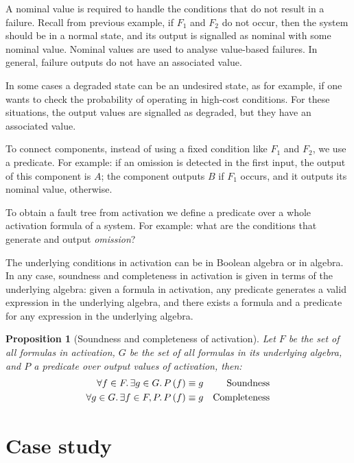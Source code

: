\documentclass[12pt,openright,twoside,a4paper,oldfontcommands,english,brazil,final]{abntex2}
\theoremstyle{theo}
\newtheorem{proposition}{Proposition}[chapter]
\newcommand{\parsin}[1]{\ensuremath\left( #1 \right)}
\begin{document}
A nominal value is required to handle the conditions that do not result in a failure.
Recall from previous example, if $F_1$ and $F_2$ do not occur, then the system should be in a normal state, and its output is signalled as nominal with some nominal value.
Nominal values are used to analyse value-based failures.
In general, failure outputs do not have an associated value.

In some cases a degraded state can be an undesired state, as for example, if one wants to check the probability of operating in high-cost conditions.
For these situations, the output values are signalled as degraded, but they have an associated value.

To connect components, instead of using a fixed condition like $F_1$ and $F_2$, we use a predicate.
For example: if an omission is detected in the first input, the output of this component is $A$; the component outputs $B$ if $F_1$ occurs, and it outputs its nominal value, otherwise.

To obtain a fault tree from \ac{activation} we define a predicate over a whole \ac{activation} formula of a system.
For example: what are the conditions that generate and output \emph{omission}?

The underlying conditions in \ac{activation} can be in Boolean algebra or in \ac{algebra}.
In any case, soundness and completeness in \ac{activation} is given in terms of the underlying algebra: given a formula in \ac{activation}, any predicate generates a valid expression in the underlying algebra, and there exists a formula and a predicate for any expression in the underlying algebra.

\begin{proposition}[Soundness and completeness of \ac{activation}]
Let $F$ be the set of all formulas in \ac{activation}, $G$ be the set of all formulas in its underlying algebra, and $P$ a predicate over output values of \ac{activation}, then:
%
\begin{subequations}
  \begin{align}
    \forall f \in F \ldotp \exists g \in G \ldotp P\parsin{f} & \equiv g & \text{Soundness} \\
    \forall g \in G \ldotp \exists f \in F, P \ldotp P\parsin{f} & \equiv g & \text{Completeness}
  \end{align}
\end{subequations}
\end{proposition}

\chapter{Case study}
\label{chap:case-study}
\end{document}
